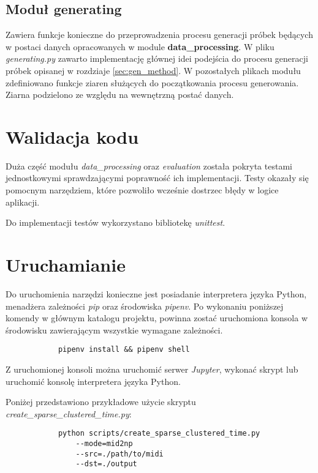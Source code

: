 {{        \subsection{Moduł generating}
        {
            Zawiera funkcje konieczne do przeprowadzenia procesu generacji próbek będących w postaci danych opracowanych w module {\textbf {data\_processing}}. W pliku {\textit {generating.py}} zawarto implementację głównej idei podejścia do procesu generacji próbek opisanej w rozdziaje \ref{sec:gen_method}. W pozostałych plikach modułu zdefiniowano funkcje ziaren służących do początkowania procesu generowania. Ziarna podzielono ze względu na wewnętrzną postać danych.
        }

    }

    \section{Walidacja kodu}
    {
        Duża część modułu {\textit {data\_processing}} oraz {\textit {evaluation}} została pokryta testami jednostkowymi sprawdzającymi poprawność ich implementacji. 
        Testy okazały się pomocnym narzędziem, które pozwoliło wcześnie dostrzec błędy w logice aplikacji.

        Do implementacji testów wykorzystano bibliotekę {\textit {unittest}}.
    }

    \section{Uruchamianie}
    {
        Do uruchomienia narzędzi konieczne jest posiadanie interpretera języka Python, menadżera zależności {\textit {pip}} oraz środowiska {\textit {pipenv}}. Po wykonaniu poniższej komendy w głównym katalogu projektu, powinna zostać uruchomiona konsola w środowisku zawierającym wszystkie wymagane zależności.

        \begin{verbatim}
            pipenv install && pipenv shell
        \end{verbatim}

        Z uruchomionej konsoli można uruchomić serwer {\textit {Jupyter}}, wykonać skrypt lub uruchomić konsolę interpretera języka Python.


        Poniżej przedstawiono przykładowe użycie skryptu \\{\textit {create\_sparse\_clustered\_time.py}}:
        \begin{verbatim}
            python scripts/create_sparse_clustered_time.py 
                --mode=mid2np 
                --src=./path/to/midi 
                --dst=./output
        \end{verbatim}
    }
}